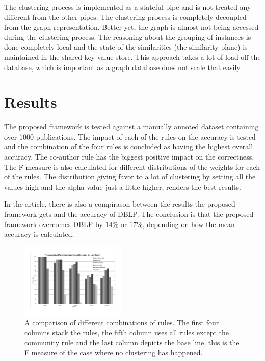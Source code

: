\documentclass[9pt, twocolumn]{phdsymp} %
\begin{document}
The clustering process is implemented as a stateful pipe and is not treated any different from the other pipes. The clustering process is completely decoupled from the graph representation. Better yet, the graph is almost not being accessed during the clustering process. The reasoning about the grouping of instances is done completely local and the state of the similarities (the similarity plane) is maintained in the shared key-value store. This approach takes a lot of load off the database, which is important as a graph database does not scale that easily.

\section{Results}

The proposed framework is tested against a manually annoted dataset containing over 1000 publications. The impact of each of the rules on the accuracy is tested and the combination of the four rules is concluded as having the highest overall accuracy. The co-author rule has the biggest positive impact on the correctness. The F measure is also calculated for different distributions of the weights for each of the rules. The distribution giving favor to a lot of clustering by setting all the values high and the alpha value just a little higher, renders the best results. 

In the article, there is also a compirason between the results the proposed framework gets and the accuracy of DBLP. The conclusion is that the proposed framework overcomes DBLP by $14\%$ or $17\%$, depending on how the mean accuracy is calculated.


\begin{figure}[htpb!]
\centering
\includegraphics[width= 0.45\textwidth]{fig/test-rules.pdf}
\caption{A comparison of different combinations of rules. The first four columns stack the rules, the fifth column uses all rules except the community rule and the last column depicts the base line, this is the F measure of the case where no clustering has happened.}
\label{fig:testperformance}
\end{figure}
\end{document}
